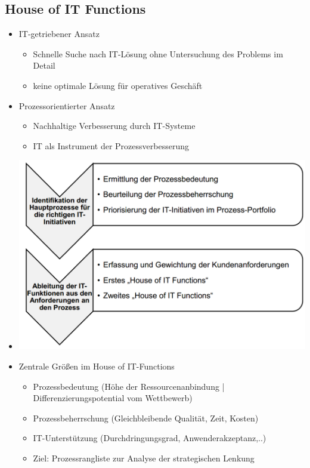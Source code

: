 \documentclass[11pt,a4paper]{article}
\begin{document}
\subsection{House of IT Functions}
\begin{itemize}
\item IT-getriebener Ansatz
	\begin{itemize}
	\item Schnelle Suche nach IT-Lösung ohne Untersuchung des Problems im Detail
	\item keine optimale Lösung für operatives Geschäft
	\end{itemize}
	
\item Prozessorientierter Ansatz
	\begin{itemize}
	\item Nachhaltige Verbesserung durch IT-Systeme
	\item IT als Instrument der Prozessverbesserung
	\end{itemize}
	
\item[] \includegraphics[width=15cm]{Bilder/itprozess}

\item Zentrale Größen im House of IT-Functions
	\begin{itemize}
	\item Prozessbedeutung (Höhe der Ressourcenanbindung | Differenzierungspotential vom Wettbewerb)
	\item Prozessbeherrschung (Gleichbleibende Qualität, Zeit, Kosten)
	\item IT-Unterstützung (Durchdringungsgrad, Anwenderakzeptanz,..)
	\item Ziel: Prozessrangliste zur Analyse der strategischen Lenkung
	\end{itemize}


\end{itemize}
\end{document}
